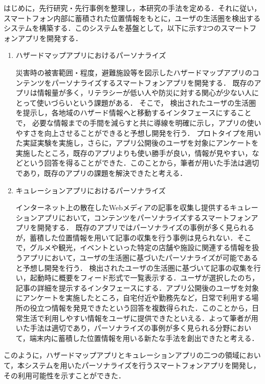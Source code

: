 \documentclass[a4paper]{jsarticle}
\begin{document}
はじめに，先行研究・先行事例を整理し，本研究の手法を定める．それに従い，スマートフォン内部に蓄積された位置情報をもとに，ユーザの生活圏を検出するシステムを構築する．このシステムを基盤として，以下に示す2つのスマートフォンアプリを開発する．
\begin{enumerate}
  \item ハザードマップアプリにおけるパーソナライズ

  災害時の被害範囲・程度，避難施設等を図示したハザードマップアプリのコンテンツをパーソナライズするスマートフォンアプリを開発する．
  既存のアプリは情報量が多く，リテラシーが低い人や防災に対する関心が少ない人にとって使いづらいという課題がある．
  そこで，
  検出されたユーザの生活圏を提示し，各地域のハザード情報へと移動するインタフェースにすることで，
  必要な情報までの手間を減らすと共に導線を明確に示し，アプリの使いやすさを向上させることができると予想し開発を行う．
  プロトタイプを用いた実証実験を実施し，さらに，アプリ公開後のユーザを対象にアンケートを実施したところ，既存のアプリよりも使い勝手が良い，情報が見やすい，などという回答を得ることができた．このことから，筆者が用いた手法は適切であり，既存のアプリの課題を解決できたと考える．

  \item キュレーションアプリにおけるパーソナライズ

  インターネット上の散在したWebメディアの記事を収集し提供するキュレーションアプリにおいて，コンテンツをパーソナライズするスマートフォンアプリを開発する．
  既存のアプリではパーソナライズの事例が多く見られるが，蓄積した位置情報を用いて記事の収集を行う事例は見られない．そこで，グルメや観光，イベントといった特定の店舗や施設に関連する情報を扱うアプリにおいて，ユーザの生活圏に基づいたパーソナライズが可能であると予想し開発を行う．
  検出されたユーザの生活圏に基づいて記事の収集を行い，起動時に概要をフィード形式で一覧表示する．ユーザが選択したのち，記事の詳細を提示するインタフェースにする．アプリ公開後のユーザを対象にアンケートを実施したところ，自宅付近や勤務先など，日常で利用する場所の役立つ情報を発見できたという回答を複数得られた．このことから，日常生活で利用しやすい情報をユーザに提供できたといえる．よって筆者が用いた手法は適切であり，パーソナライズの事例が多く見られる分野において，端末内に蓄積した位置情報を用いる新たな手法を創出できたと考える．
\end{enumerate}

このように，ハザードマップアプリとキュレーションアプリの二つの領域において，本システムを用いたパーソナライズを行うスマートフォンアプリを開発し，その利用可能性を示すことができた．
\end{document}
